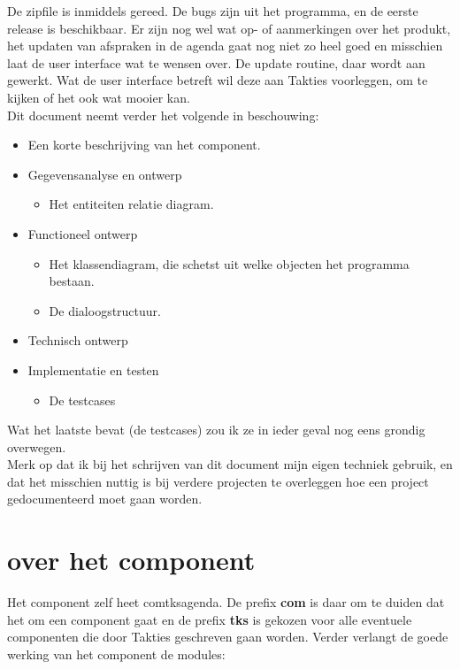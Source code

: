 \documentclass{article}
\begin{document}
De zipfile is inmiddels gereed. De bugs zijn uit het programma, en de eerste release is beschikbaar. Er zijn nog wel wat op- of aanmerkingen over het produkt, het updaten van afspraken in de agenda gaat nog niet zo heel goed en misschien laat de user interface wat te wensen over. De update routine, daar wordt aan gewerkt. Wat de user interface betreft wil deze aan Takties voorleggen, om te kijken of het ook wat mooier kan. \\
\newpage
Dit document neemt verder het volgende in beschouwing:\\
\begin{itemize}
\item Een korte beschrijving van het component. \\
\item Gegevensanalyse en ontwerp
\begin{itemize}
\item Het entiteiten relatie diagram. \\
\end{itemize}
\item Functioneel ontwerp
\begin{itemize}
\item Het klassendiagram, die schetst uit welke objecten het programma bestaan. \\
\item De dialoogstructuur. \\
\end{itemize}
\item Technisch ontwerp
\item Implementatie en testen
\begin{itemize}
\item De testcases
\end{itemize}
\end{itemize}
Wat het laatste bevat (de testcases) zou ik ze in ieder geval nog eens grondig overwegen. \\
Merk op dat ik bij het schrijven van dit document mijn eigen techniek gebruik, en dat het misschien nuttig is bij verdere projecten te overleggen hoe een project gedocumenteerd moet gaan worden.

\newpage
\section{over het component}

Het component zelf heet com\textunderscore tks\textunderscore agenda. De prefix \textbf{com\textunderscore} is daar om te duiden dat het om een component gaat en de prefix \textbf{tks\textunderscore} is gekozen voor alle eventuele componenten die door Takties geschreven gaan worden. Verder verlangt de goede werking van het component de modules: \\
\end{document}
